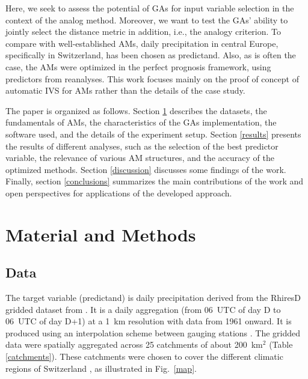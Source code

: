 \documentclass[draft]{agujournal2019}
\begin{document}
Here, we seek to assess the potential of GAs for input variable selection in the context of the analog method. Moreover, we want to test the GAs' ability to jointly select the distance metric in addition, i.e., the analogy criterion. To compare with well-established AMs, daily precipitation in central Europe, specifically in Switzerland, has been chosen as predictand. Also, as is often the case, the AMs were optimized in the perfect prognosis framework, using predictors from reanalyses. This work focuses mainly on the proof of concept of automatic IVS for AMs rather than the details of the case study.

The paper is organized as follows. Section \ref{material_methods} describes the datasets, the fundamentals of AMs, the characteristics of the GAs implementation, the software used, and the details of the experiment setup. Section \ref{results} presents the results of different analyses, such as the selection of the best predictor variable, the relevance of various AM structures, and the accuracy of the optimized methods. Section \ref{discussion} discusses some findings of the work. Finally, section \ref{conclusions} summarizes the main contributions of the work and open perspectives for applications of the developed approach.


\section{Material and Methods}
\label{material_methods}

\subsection{Data}
\label{data}

The target variable (predictand) is daily precipitation derived from the RhiresD gridded dataset from . It is a daily aggregation (from 06~UTC of day D to 06~UTC of day D+1) at a 1~km resolution with data from 1961 onward. It is produced using an interpolation scheme between gauging stations \cite{Frei1998}. The gridded data were spatially aggregated across 25 catchments of about 200~km$^2$ (Table \ref{catchments}). These catchments were chosen to cover the different climatic regions of Switzerland \cite{Schuepp1980}, as illustrated in Fig.~\ref{map}.
\end{document}
